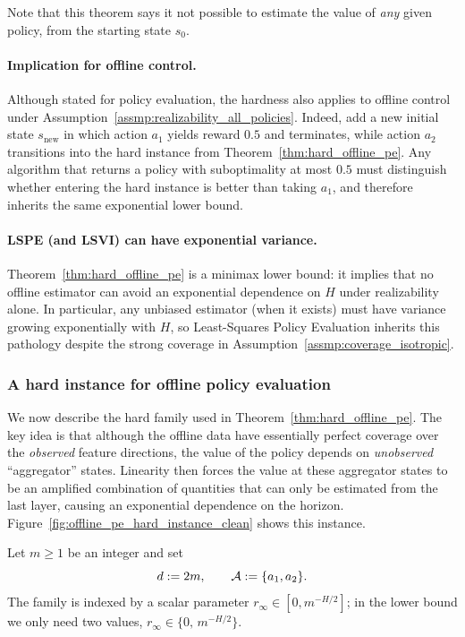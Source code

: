 Note that this theorem says it not possible to estimate the value of
\emph{any} given policy, from the starting state $s_0$.

\paragraph{Implication for offline control.}
Although stated for policy evaluation, the hardness also applies to offline
control under Assumption~\ref{assmp:realizability_all_policies}.  Indeed, add a
new initial state $s_{\mathrm{new}}$ in which action $a_1$ yields reward $0.5$ and
terminates, while action $a_2$ transitions into the hard instance from
Theorem~\ref{thm:hard_offline_pe}.  Any algorithm that returns a policy with
suboptimality at most $0.5$ must distinguish whether entering the hard instance is
better than taking $a_1$, and therefore inherits the same exponential lower bound.

\paragraph{LSPE (and LSVI) can have exponential variance.}
Theorem~\ref{thm:hard_offline_pe} is a minimax lower bound: it implies that no
offline estimator can avoid an exponential dependence on $H$ under realizability
alone.  In particular, any unbiased estimator (when it exists) must have variance
growing exponentially with $H$, so Least-Squares Policy Evaluation inherits this
pathology despite the strong coverage in Assumption~\ref{assmp:coverage_isotropic}.


\subsubsection{A hard instance for offline policy evaluation}
\label{subsubsec:hard_instance_offline_pe}

We now describe the hard family used in Theorem~\ref{thm:hard_offline_pe}.  The
key idea is that although the offline data have essentially perfect coverage over
the \emph{observed} feature directions, the value of the policy depends on
\emph{unobserved} ``aggregator'' states.  Linearity then forces the value at these
aggregator states to be an amplified combination of quantities that can only be
estimated from the last layer, causing an exponential dependence on
the horizon. Figure~\ref{fig:offline_pe_hard_instance_clean} shows
this instance. 

Let $m\ge 1$ be an integer and set
\[
d := 2m,
\qquad
\mathcal{A} := \{a_1,a_2\}.
\]
The family is indexed by a scalar parameter $r_\infty\in[0,m^{-H/2}]$; in the
lower bound we only need two values, $r_\infty\in\{0,\,m^{-H/2}\}$.

